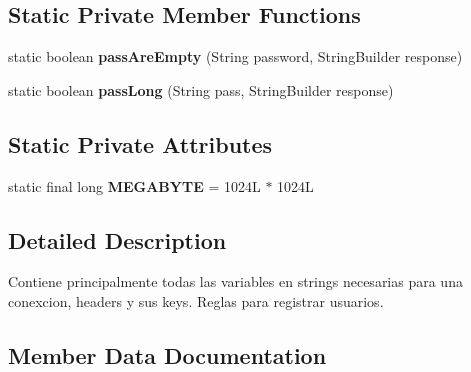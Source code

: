 \subsection*{Static Private Member Functions}
\begin{DoxyCompactItemize}
\item 
static boolean {\bfseries pass\+Are\+Empty} (String password, String\+Builder response)\hypertarget{classcom_1_1example_1_1sebastian_1_1tindertp_1_1commonTools_1_1Common_a824d7411383e3fa2a7c3d9754ee0e950}{}\label{classcom_1_1example_1_1sebastian_1_1tindertp_1_1commonTools_1_1Common_a824d7411383e3fa2a7c3d9754ee0e950}

\item 
static boolean {\bfseries pass\+Long} (String pass, String\+Builder response)\hypertarget{classcom_1_1example_1_1sebastian_1_1tindertp_1_1commonTools_1_1Common_a5e66efe07443c8aadee9736fb637602a}{}\label{classcom_1_1example_1_1sebastian_1_1tindertp_1_1commonTools_1_1Common_a5e66efe07443c8aadee9736fb637602a}

\end{DoxyCompactItemize}
\subsection*{Static Private Attributes}
\begin{DoxyCompactItemize}
\item 
static final long {\bfseries M\+E\+G\+A\+B\+Y\+TE} = 1024\+L $\ast$ 1024L\hypertarget{classcom_1_1example_1_1sebastian_1_1tindertp_1_1commonTools_1_1Common_a2d34a6eb47d9949b171c61f5191667e8}{}\label{classcom_1_1example_1_1sebastian_1_1tindertp_1_1commonTools_1_1Common_a2d34a6eb47d9949b171c61f5191667e8}

\end{DoxyCompactItemize}


\subsection{Detailed Description}
Contiene principalmente todas las variables en strings necesarias para una conexcion, headers y sus keys. Reglas para registrar usuarios. 

\subsection{Member Data Documentation}
